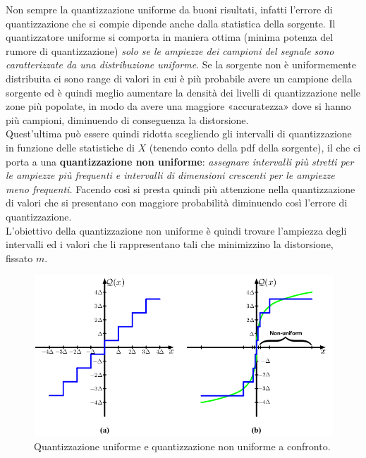 Non sempre la quantizzazione uniforme da buoni risultati, infatti l’errore di quantizzazione che si compie
dipende anche dalla statistica della sorgente. Il quantizzatore uniforme si comporta in maniera ottima
(minima potenza del rumore di quantizzazione) \textit{solo se le ampiezze dei campioni del segnale sono caratterizzate da una distribuzione uniforme}. Se la sorgente non è uniformemente distribuita ci sono range di valori in cui è più probabile avere un campione della sorgente ed è quindi meglio aumentare la densità dei livelli di quantizzazione nelle zone più popolate, in modo da avere una maggiore «accuratezza» dove si hanno più campioni, diminuendo di conseguenza la distorsione.\\
Quest'ultima può essere quindi ridotta scegliendo gli intervalli di quantizzazione in funzione delle statistiche
di $X$ (tenendo conto della pdf della sorgente), il che ci porta a una \textbf{quantizzazione non uniforme}: \textit{assegnare intervalli più stretti per le ampiezze più frequenti e intervalli di dimensioni crescenti per le ampiezze meno frequenti.} Facendo così si presta quindi più attenzione nella quantizzazione di valori che si presentano con maggiore probabilità diminuendo così l'errore di quantizzazione. \\
L'obiettivo della quantizzazione non uniforme è quindi trovare l’ampiezza degli intervalli ed i valori che li rappresentano tali che minimizzino la distorsione, fissato $m$.

\begin{figure}[H]
    \centering
    \includegraphics[scale=0.3]{img/uniform.png}
    \caption{Quantizzazione uniforme e quantizzazione non uniforme a confronto.}
    \label{fig:unif}
\end{figure}

